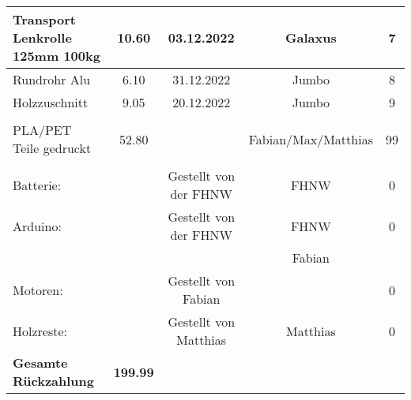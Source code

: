 \begin{table}[H]
{\begin{tabular}{|l|c|c|c|c|}
    Transport   Lenkrolle 125mm 100kg  & 10.60                      & 03.12.2022                & Galaxus             & 7                         \\ \hline
    Rundrohr Alu                       & 6.10                       & 31.12.2022                & Jumbo               & 8                         \\ \hline
    Holzzuschnitt                      & 9.05                       & 20.12.2022                & Jumbo               & 9                         \\ \hline
                                       &                            &                           &                     &                           \\ \hline
    PLA/PET Teile   gedruckt           & 52.80                      &                           & Fabian/Max/Matthias & 99                        \\ \hline
                                       &                            &                           &                     &                           \\ \hline
    Batterie:                          &                            & Gestellt von der FHNW     & FHNW                & 0                         \\ \hline
    Arduino:                           &                            & Gestellt von der FHNW     & FHNW                & 0                         \\ \hline
                                       &                            &                           & Fabian              &                           \\ \hline
    Motoren:                           &                            & Gestellt von Fabian       &                     & 0                         \\ \hline
    Holzreste:                         &                            & Gestellt von Matthias     & Matthias            & 0                         \\ \hline
    \rowcolor[HTML]{C6E0B4} 
    \textbf{Gesamte   Rückzahlung}     & \textbf{199.99}            & \textbf{}                 & \textbf{}           & \textbf{}                 \\ \hline
    \end{tabular}%
    }
    \end{table}